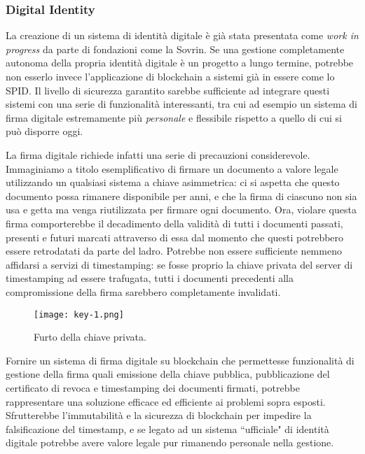        \subsubsection{Digital Identity}
        	La creazione di un sistema di identità digitale è già stata presentata come \emph{work in progress} da parte di fondazioni come la Sovrin. Se una gestione completamente autonoma della propria identità digitale è un progetto a lungo termine, potrebbe non esserlo invece l'applicazione di blockchain a sistemi già in essere come lo SPID. Il livello di sicurezza garantito sarebbe sufficiente ad integrare questi sistemi con una serie di funzionalità interessanti, tra cui ad esempio un sistema di firma digitale estremamente più \emph{personale} e flessibile rispetto a quello di cui si può disporre oggi.
        	
        	La firma digitale richiede infatti una serie di precauzioni considerevole. Immaginiamo a titolo esemplificativo di firmare un documento a valore legale utilizzando un qualsiasi sistema a chiave asimmetrica: ci si aspetta che questo documento possa rimanere disponibile per anni, e che la firma di ciascuno non sia usa e getta ma venga riutilizzata per firmare ogni documento. Ora, violare questa firma comporterebbe il decadimento della validità di tutti i documenti passati, presenti e futuri marcati attraverso di essa dal momento che questi potrebbero essere retrodatati da parte del ladro. Potrebbe non essere sufficiente nemmeno affidarsi a servizi di timestamping: se fosse proprio la chiave privata del server di timestamping ad essere trafugata, tutti i documenti precedenti alla compromissione della firma sarebbero completamente invalidati.
        	
        	\begin{figure}[ht]
        		\centering
        		\texttt{[image: key-1.png]}
        		\caption[Furto della chiave privata]{Furto della chiave privata. \cite{ametrano_signature}}
        		\label{fig:key-1}
        	\end{figure}
        	
   			Fornire un sistema di firma digitale su blockchain che permettesse funzionalità di gestione della firma quali emissione della chiave pubblica, pubblicazione del certificato di revoca e timestamping dei documenti firmati, potrebbe rappresentare una soluzione efficace ed efficiente ai problemi sopra esposti. Sfrutterebbe l'immutabilità e la sicurezza di blockchain per impedire la falsificazione del timestamp, e se legato ad un sistema ``ufficiale" di identità digitale potrebbe avere valore legale pur rimanendo personale nella gestione.
   			
